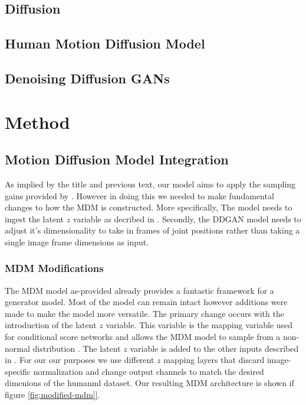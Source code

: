 \documentclass[10pt,twocolumn,letterpaper]{article}
\begin{document}
\subsection{Diffusion}

\subsection{Human Motion Diffusion Model}

\subsection{Denoising Diffusion GANs}


\section{Method}
\label{sec:method}

\subsection{Motion Diffusion Model Integration}
As implied by the title and previous text, our model aims to apply the sampling gains provided by \cite{Xiao22}. However in doing this we needed to make fundamental changes to how the MDM is constructed. More specifically, The model needs to ingest the latent $z$ variable as decribed in \cite{Xiao22}. Secondly, the DDGAN model needs to adjust it's dimensionality to take in frames of joint positions rather than taking a single image frame dimensions as input.

\subsubsection{MDM Modifications}

The MDM model as-provided already provides a fantastic framework for a generator model. Most of the model can remain intact however additions were made to make the model more versatile. The primary change occurs with the introduction of the latent $z$ variable. This variable is the mapping variable used for conditional score networks and allows the MDM model to sample from a non-normal distribution \cite{xiao2022tackling}. The latent $z$ variable is added to the other inputs described in \cite{Tevet23}. For our our purposes we use different $z$ mapping layers that discard image-specific normalization and change output channels to match the desired dimenions of the humanml dataset.  Our resulting MDM architecture is shown if figure \ref{fig:modified-mdm]}. \par
\end{document}
